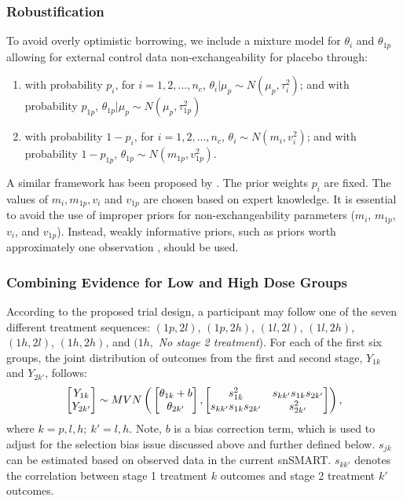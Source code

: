 \subsubsection{Robustification} \label{sec:robust}
To avoid overly optimistic borrowing, we include a mixture model for $\theta_i$ and $\theta_{1p}$ allowing for external control data non-exchangeability for placebo through: 
\begin{enumerate}
    \item with probability $p_{i}$, for $i = 1, 2,...,n_c$, $\theta_i|\mu_p \sim N(\mu_p, \tau_{i}^2)$; and with probability $p_{1p}$, $\theta_{1p}|\mu_p \sim N(\mu_p, \tau_{1p}^2)$
    \item with probability $1 - p_{i}$, for $i = 1, 2,...,n_c$, $\theta_i \sim N(m_i, v_i^2)$; and with probability $1 - p_{1p}$, $\theta_{1p} \sim N(m_{1p}, v_{1p}^2)$.
\end{enumerate}
A similar framework has been proposed by \cite{neuenschwander2016use}.
The prior weights $p_i$ are fixed. The values of $m_i, m_{1p}, v_i$ and $v_{1p}$ are chosen based on expert knowledge. It is essential to avoid the use of improper priors for non-exchangeability parameters ($m_{i}$, $m_{1p}$, $v_{i}$, and $v_{1p}$). Instead, weakly informative priors, such as priors worth approximately one observation \citep{kass1995reference}, should be used. 

\subsubsection{Combining Evidence for Low and High Dose Groups}

According to the proposed trial design, a participant may follow one of the seven different treatment sequences: $(1p, 2l)$, $(1p, 2h)$, $(1l, 2l)$, $(1l, 2h)$, $(1h, 2l)$, $(1h, 2h)$, and $(1h,$ \emph{No stage 2 treatment}). 
For each of the first six groups, the joint distribution of outcomes from the first and second stage, $Y_{1k}$ and $Y_{2k'}$, follows:
\begin{equation}\label{eq:joint}
\begin{bmatrix} Y_{1k} \\ Y_{2k'} \end{bmatrix} \sim MVN\left(\\ \begin{bmatrix} \theta_{1k} + b \\ \theta_{2k'}\end{bmatrix}, \begin{bmatrix} s_{1k}^2 & s_{kk'}s_{1k}s_{2k'}\\ s_{kk'}s_{1k}s_{2k'} & s_{2k'}^2\end{bmatrix}\right),
\end{equation}   
where $k = p, l, h; \ k' = l, h$. Note, $b$ is a bias correction term, which is used to adjust for the selection bias issue discussed above and further defined below. $s_{jk}$ can be estimated based on observed data in the current \ac{snSMART}. $s_{kk'}$ denotes the correlation between stage 1 treatment $k$ outcomes and stage 2 treatment $k'$ outcomes. 

